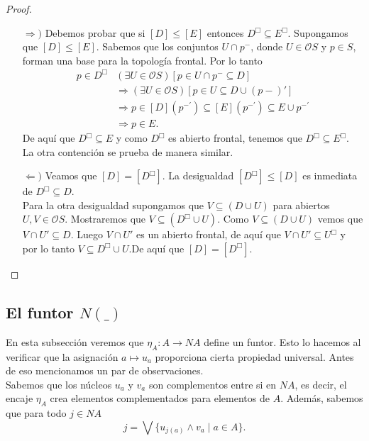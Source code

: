 \begin{proof}
    \begin{itemize}
        \item[$\Rightarrow )$] Debemos probar que si $[D]\leq [E]$ entonces $D^\Box\subseteq E^\Box$. Supongamos que $[D]\leq [E]$. Sabemos que los conjuntos $U\cap p^-$, donde $U\in \mathcal{O}S$ y $p\in S$, forman una base para la topología frontal. Por lo tanto 
        \[
        \begin{split}
            p\in D^\Box & (\exists U\in \mathcal{O}S)[p\in U\cap p^-\subseteq D]\\
            & \Rightarrow (\exists U\in \mathcal{O}S)[p\in U\subseteq D\cup (p-)']\\
            & \Rightarrow p\in [D](p^{-'})\subseteq [E](p^{-'})\subseteq E\cup p^{-'}\\
            & \Rightarrow p\in E.
        \end{split}
        \]
        De aquí que $D^\Box\subseteq E$ y como $D^\Box$ es abierto frontal, tenemos que $D^\Box\subseteq E^\Box$.\\

        La otra contención se prueba de manera similar.
        
        \item[$\Leftarrow )$] Veamos que $[D]=[D^\Box]$. La desigualdad $[D^\Box]\leq [D]$ es inmediata de $D^\Box \subseteq D$.\\
        
        Para la otra desigualdad supongamos que $V\subseteq (D\cup U)$ para abiertos $U, V\in \mathcal{O}S$. Mostraremos que $V\subseteq (D^\Box\cup U)$. Como $V\subseteq (D\cup U)$ vemos que $V\cap U'\subseteq D$. Luego $V\cap U'$ es un abierto frontal, de aquí que $V\cap U'\subseteq U^\Box$ y por lo tanto $V\subseteq D^\Box\cup U$.De aquí que $[D]=[D^\Box]$.
    \end{itemize}
\end{proof}

\subsection{El funtor $N( \_ )$}

En esta subsección veremos que $\eta_A\colon A\to NA$ define un funtor. Esto lo hacemos al verificar que la asignación $a\mapsto u_a$ proporciona cierta propiedad universal. Antes de eso mencionamos un par de observaciones.\\

Sabemos que los núcleos $u_a$ y $v_a$ son complementos entre si en $NA$, es decir, el encaje $\eta_A$ crea elementos complementados para elementos de $A$. Además, sabemos que para todo $j\in NA$
\[
j=\bigvee\{u_{j(a)}\wedge v_a\mid a\in A\}.
\]

